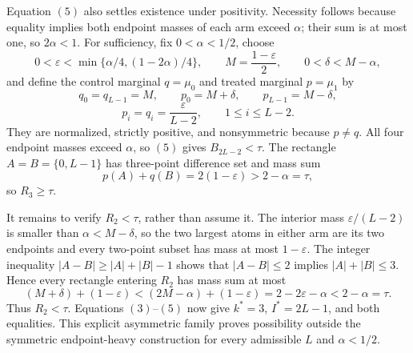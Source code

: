 Equation \((5)\) also settles existence under positivity.  Necessity follows because equality implies both endpoint masses of each arm exceed \(\alpha\); their sum is at most one, so \(2\alpha<1\).  For sufficiency, fix \(0<\alpha<1/2\), choose
\[
0<\varepsilon<\min\{\alpha/4,(1-2\alpha)/4\},
\qquad
M=\frac{1-\varepsilon}{2},
\qquad
0<\delta<M-\alpha,
\]
and define the control marginal \(q=\mu_0\) and treated marginal \(p=\mu_1\) by
\[
q_0=q_{L-1}=M,
\qquad
p_0=M+\delta,
\qquad
p_{L-1}=M-\delta,
\]
\[
p_i=q_i=\frac{\varepsilon}{L-2},
\qquad 1\leq i\leq L-2.
\]
They are normalized, strictly positive, and nonsymmetric because \(p\neq q\).  All four endpoint masses exceed \(\alpha\), so \((5)\) gives \(B_{2L-2}<\tau\).  The rectangle \(A=B=\{0,L-1\}\) has three-point difference set and mass sum
\[
p(A)+q(B)=2(1-\varepsilon)>2-\alpha=\tau,
\]
so \(R_3\geq\tau\).

It remains to verify \(R_2<\tau\), rather than assume it.  The interior mass \(\varepsilon/(L-2)\) is smaller than \(\alpha<M-\delta\), so the two largest atoms in either arm are its two endpoints and every two-point subset has mass at most \(1-\varepsilon\).  The integer inequality \(|A-B|\geq|A|+|B|-1\) shows that \(|A-B|\leq2\) implies \(|A|+|B|\leq3\).  Hence every rectangle entering \(R_2\) has mass sum at most
\[
(M+\delta)+(1-\varepsilon)
<(2M-\alpha)+(1-\varepsilon)
=2-2\varepsilon-\alpha
<2-\alpha=\tau.
\]
Thus \(R_2<\tau\).  Equations \((3)\)--\((5)\) now give \(k^*=3\), \(I^*=2L-1\), and both equalities.  This explicit asymmetric family proves possibility outside the symmetric endpoint-heavy construction for every admissible \(L\) and \(\alpha<1/2\).
